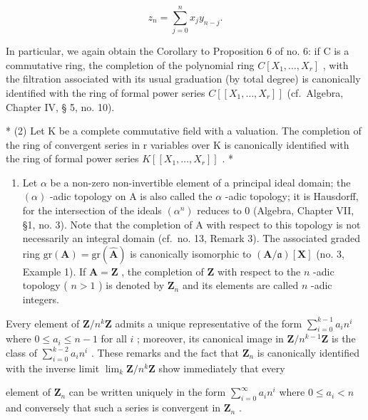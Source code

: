 \begin{enumerate}
\[
z _ {n} = \sum_ {j = 0} ^ {n} x _ {j} y _ {n - j}.\tag{26}
\]

In particular, we again obtain the Corollary to Proposition 6 of no. 6: if C is a commutative ring, the completion of the polynomial ring \(C[X_{1},\ldots,X_{r}]\) , with the filtration associated with its usual graduation (by total degree) is canonically identified with the ring of formal power series \(C[[X_{1},\ldots,X_{r}]]\) (cf.~Algebra, Chapter IV, § 5, no. 10).
\end{enumerate}

* (2) Let K be a complete commutative field with a valuation. The completion of the ring of convergent series in r variables over K is canonically identified with the ring of formal power series \(K[[X_{1},\ldots,X_{r}]]\) . *

\begin{enumerate}
\def\labelenumi{(\arabic{enumi})}
\setcounter{enumi}{2}
\tightlist
\item
  Let \(\alpha\) be a non-zero non-invertible element of a principal ideal domain; the \((\alpha)\) -adic topology on A is also called the \(\alpha\) -adic topology; it is Hausdorff, for the intersection of the ideals \((\alpha^n)\) reduces to 0 (Algebra, Chapter VII, §1, no. 3). Note that the completion of A with respect to this topology is not necessarily an integral domain (cf.~no. 13, Remark 3). The associated graded ring \(\mathrm{gr}(\mathbf{A}) = \mathrm{gr}(\hat{\mathbf{A}})\) is canonically isomorphic to \((\mathbf{A}/\mathfrak{a})[\mathbf{X}]\) (no. 3, Example 1). If \(\mathbf{A} = \mathbf{Z}\) , the completion of \(\mathbf{Z}\) with respect to the \(n\) -adic topology ( \(n > 1\) ) is denoted by \(\mathbf{Z}_n\) and its elements are called \(n\) -adic integers.
\end{enumerate}

Every element of \(\mathbf{Z} / n^k\mathbf{Z}\) admits a unique representative of the form \(\sum_{i=0}^{k-1} a_i n^i\) where \(0 \leqslant a_i \leqslant n - 1\) for all \(i\) ; moreover, its canonical image in \(\mathbf{Z} / n^{k-1}\mathbf{Z}\) is the class of \(\sum_{i=0}^{k-2} a_i n^i\) . These remarks and the fact that \(\mathbf{Z}_n\) is canonically identified with the inverse limit \(\lim_{k} \mathbf{Z}/n^k \mathbf{Z}\) show immediately that every

element of \(\mathbf{Z}_n\) can be written uniquely in the form \(\sum_{i=0}^{\infty} a_i n^i\) where \(0 \leqslant a_i < n\) and conversely that such a series is convergent in \(\mathbf{Z}_n\) .
